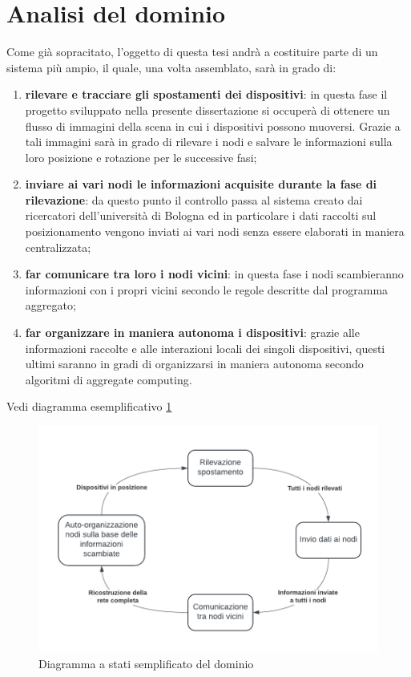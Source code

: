 \documentclass[12pt,a4paper,openright,twoside]{book}
\begin{document}
\section{Analisi del dominio}
Come già sopracitato, l’oggetto di questa tesi andrà a costituire parte di un sistema più ampio, il quale, una volta assemblato, sarà in grado di:
\begin{enumerate}
	\item \textbf{rilevare e tracciare gli spostamenti dei dispositivi}: in questa fase il progetto sviluppato nella presente dissertazione si occuperà di ottenere un flusso di immagini della scena in cui i dispositivi possono muoversi. Grazie a tali immagini sarà in grado di rilevare i nodi e salvare le informazioni sulla loro posizione e rotazione per le successive fasi;
	\item \textbf{inviare ai vari nodi le informazioni acquisite durante la fase di rilevazione}: da questo punto il controllo passa al sistema creato dai ricercatori dell'università di Bologna ed in particolare i dati raccolti sul posizionamento vengono inviati ai vari nodi senza essere elaborati in maniera centralizzata;
	\item \textbf{far comunicare tra loro i nodi vicini}: in questa fase i nodi scambieranno informazioni con i propri vicini secondo le regole descritte dal programma aggregato;
	\item \textbf{far organizzare in maniera autonoma i dispositivi}: grazie alle informazioni raccolte e alle interazioni locali dei singoli dispositivi, questi ultimi saranno in gradi di organizzarsi in maniera autonoma secondo algoritmi di aggregate computing.
\end{enumerate}

Vedi diagramma esemplificativo \ref{fig:domain_diagram}
\begin{figure}[h!]
	\centering
	\includegraphics[width=0.8\linewidth]{./figures/UML/domainDiagram.pdf}
	\caption{Diagramma a stati semplificato del dominio}
	\label{fig:domain_diagram}
\end{figure}
\end{document}
